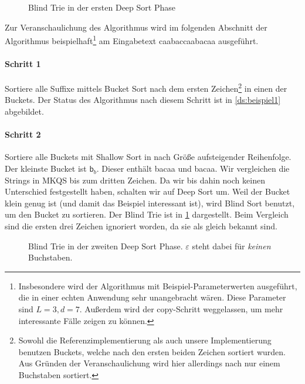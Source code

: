 \newcommand{\tnode}{\node[draw,circle]}
\newcommand{\trans}{\draw[-stealth]}
\begin{figure}[!h]
\centering
{}
\caption{Blind Trie in der ersten Deep Sort Phase}
\label{ds:beispiel_bt1}
\end{figure}

Zur Veranschaulichung des Algorithmus wird im folgenden Abschnitt der Algorithmus
beispielhaft\footnote{Insbesondere wird der Algorithmus mit Beispiel-Parameterwerten ausgeführt,
die in einer echten Anwendung sehr unangebracht wären. Diese Parameter sind $L = 3, d = 7$. Außerdem wird der copy-Schritt weggelassen, um mehr interessante Fälle zeigen zu können.}
am Eingabetext \glqq caabaccaabacaa\grqq{} ausgeführt.

\paragraph{Schritt 1} Sortiere alle Suffixe mittels Bucket Sort nach dem ersten Zeichen\footnote{Sowohl die Referenzimplementierung als auch unsere Implementierung benutzen Buckets, welche nach den ersten beiden Zeichen sortiert wurden.
Aus Gründen der Veranschaulichung wird hier allerdings nach nur einem Buchstaben sortiert.} in einen der Buckets.
Der Status des Algorithmus nach diesem Schritt ist in \cref{ds:beispiel1} abgebildet.

\paragraph{Schritt 2} Sortiere alle Buckets mit Shallow Sort in nach Größe aufsteigender Reihenfolge.
Der kleinste Bucket ist $\mathsf{b}_b$.
Dieser enthält \glqq bacaa\grqq{} und \glqq bacaa\grqq.
Wir vergleichen die Strings in MKQS bis zum dritten Zeichen.
Da wir bis dahin noch keinen Unterschied festgestellt haben, schalten wir auf Deep Sort um. 
Weil der Bucket klein genug ist (und damit das Beispiel interessant ist), wird Blind Sort benutzt, um den Bucket zu sortieren.
Der Blind Trie ist in \cref{ds:beispiel_bt1} dargestellt.
Beim Vergleich sind die ersten drei Zeichen ignoriert worden, da sie als gleich bekannt sind.

\begin{figure}
\centering
{}
\caption{Blind Trie in der zweiten Deep Sort Phase. $\varepsilon$ steht dabei für \emph{keinen} Buchstaben.}
\label{ds:beispiel_bt2}
\end{figure}

